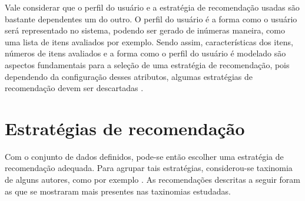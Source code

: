 Vale considerar que o perfil do usuário e a estratégia de recomendação usadas
são bastante dependentes um do outro. O perfil do usuário é a forma como o
usuário será representado no sistema, podendo ser gerado de inúmeras maneira,
como uma lista de itens avaliados por exemplo. Sendo assim, características dos itens,
números de itens avaliados e a forma como o perfil do usuário é modelado são aspectos
fundamentais para a seleção de uma estratégia de recomendação, pois dependendo
da configuração desses atributos, algumas estratégias
de recomendação devem ser descartadas \cite{picault2011get}.

\section{Estratégias de recomendação}

Com o conjunto de dados definidos, pode-se então escolher uma estratégia de
recomendação adequada. Para agrupar tais estratégias, considerou-se taxinomia de
alguns autores, como por exemplo \cite{burke2007hybrid}. As recomendações
descritas a seguir foram as que se mostraram mais presentes nas taxinomias
estudadas.

